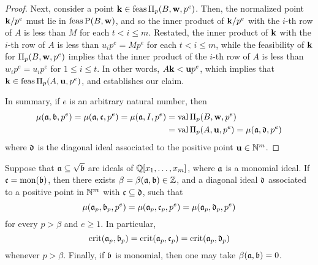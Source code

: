 \documentclass[11pt]{amsart}
\begin{document}
\begin{proof}
Next, consider a point $\mathbf{k} \in \operatorname{feas} \Pi_p(B, \mathbf{w},p^e)$.  Then, the normalized point $\mathbf{k}/p^e$ must lie in $\operatorname{feas}\mathrm{P}(B,\mathbf{w})$, and so the inner product of $\mathbf{k}/p^e$ with the $i$-th row of $A$ is less than $M$ for each $t < i \leq m$.    Restated, the inner product of $\mathbf{k}$ with the $i$-th row of $A$ is less than $u_ip^e = Mp^e$ for each $t < i \leq m$, while the feasibility of $\mathbf{k}$ for $\Pi_p(B,\mathbf{w},p^e)$ implies that the inner product of the $i$-th row of $A$ is less than $w_ip^e = u_ip^e$ for $1 \leq i \leq t$.  In other words, $A \mathbf{k} < \mathbf{u}p^e$, which implies that $\mathbf{k} \in \operatorname{feas} \Pi_p(A,\mathbf{u},p^e)$, and establishes our claim. 

In summary, if $e$ is an arbitrary natural number, then
\begin{align*}
 \mu(\mathfrak{a}, \mathfrak{b}, p^e) = \mu(\mathfrak{a}, \mathfrak{c}, p^e) = \mu(\mathfrak{a}, I, p^e) & = \operatorname{val}\Pi_p(B, \mathbf{w}, p^e) \\ 
 & = \operatorname{val} \Pi_p(A, \mathbf{u}, p^e) = \mu(\mathfrak{a}, \mathfrak{d}, p^e) 
\end{align*}
where $\mathfrak{d}$ is the diagonal ideal associated to the positive point $\mathbf{u} \in \mathbb{N}^m$. 
 \end{proof}

 
\begin{corollary} \label{nu-mu-reduce-monomial: C}
Suppose that $\mathfrak{a} \subseteq \sqrt{\mathfrak{b}}$ are ideals of $\mathbb{Q}[x_1, \ldots, x_m]$, where $\mathfrak{a}$ is a monomial ideal. If $\mathfrak{c} = \operatorname{mon}(\mathfrak{b})$, then there exists $\beta = \beta(\mathfrak{a}, \mathfrak{b}) \in \mathbb{Z}$, and a diagonal ideal $\mathfrak{d}$ associated to a positive point in $\mathbb{N}^m$ with $\mathfrak{c} \subseteq \mathfrak{d}$, such that 
\[ \mu(\mathfrak{a}_p, \mathfrak{b}_p, p^e) =  \mu(\mathfrak{a}_p, \mathfrak{c}_p, p^e) =  \mu(\mathfrak{a}_p, \mathfrak{d}_p, p^e) \] 
for every $p > \beta$ and $e \geq 1$.  In particular, 
\[ \operatorname{crit}(\mathfrak{a}_p, \mathfrak{b}_p) =  \operatorname{crit}(\mathfrak{a}_p, \mathfrak{c}_p) =  \operatorname{crit}(\mathfrak{a}_p, \mathfrak{d}_p)\] whenever $p > \beta$.  
Finally, if $\mathfrak{b}$ is monomial, then one may take $\beta(\mathfrak{a}, \mathfrak{b}) = 0$.
\end{corollary}
\end{document}
